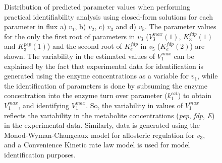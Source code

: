 \documentclass[10pt]{article}
\begin{document}
	\begin{figure}[!tbhp]
		\caption{Distribution of predicted parameter values when performing practical identifiability analysis using closed-form solutions for each parameter in flux a) $v_1$, b) $v_2$, c) $v_3$ and d) $v_5$. The parameter values for the only the first root of parameters in $v_3$ ($V_3^{max}(1)$, $K_3^{fdp}(1)$ and $K_3^{pep}(1)$) and the second root of $K_e^{fdp}$ in $v_5$ ($K_e^{fdp}(2)$) are shown. The variability in the estimated values of $V_1^{max}$ can be explained by the fact that experimental data for identification is generated using the enzyme concentrations as a variable for $v_1$, while the identification of parameters is done by subsuming the enzyme concentration into the enzyme turn over parameter ($k_1^{cat}$) to obtain $V_1^{max}$, and identifying $V_1^{max}$. So, the variability in values of $V_1^{max}$ reflects the variability in the metabolite concentrations (\textit{pep}, \textit{fdp}, \textit{E}) in the experimental data. Similarly, data is generated using the Monod-Wyman-Changeaux model for allosteric regulation for $v_3$, and a Convenience Kinetic rate law model is used for model identification purposes.}\label{fig:parameter_value_v1_vmax}
	\end{figure}	
\end{document}

